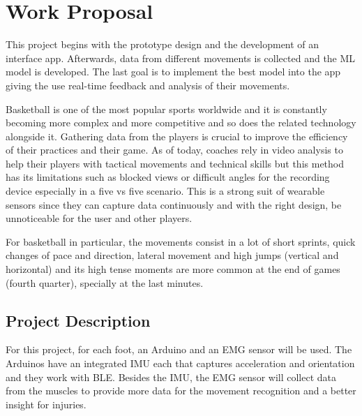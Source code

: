 



\chapter{Work Proposal}
\label{cha:workProposal}

This project begins with the prototype design and the development of an interface app. Afterwards, data from different movements is collected and the \gls{ML} model is developed. The last goal is to implement the best model into the app 
giving the use real-time feedback and analysis of their movements.

Basketball is one of the most popular sports worldwide and it is constantly becoming more complex and more competitive and so does the related technology alongside it. Gathering data from the players is crucial 
to improve the efficiency of their practices and their game. As of today, coaches rely in video analysis to help their players with tactical movements and technical skills but this method has its 
limitations such as blocked views or difficult angles for the recording device especially in a five vs five scenario. This is a strong suit of wearable sensors since they can capture data
continuously and with the right design, be unnoticeable for the user and other players.

For basketball in particular, the movements consist in a lot of short sprints, quick changes of pace and direction, lateral movement and high jumps (vertical and horizontal) and its high tense moments are more common 
at the end of games (fourth quarter), specially at the last minutes.


\section{Project Description}
\label{sec:project_description}

For this project, for each foot, an Arduino and an \gls{EMG} sensor will be used. The Arduinos have an integrated \gls{IMU} each that captures acceleration and orientation and they work with \gls{BLE}.
Besides the \gls{IMU}, the \gls{EMG} sensor will collect data from the muscles to provide more data for the movement recognition and a better insight for injuries.

